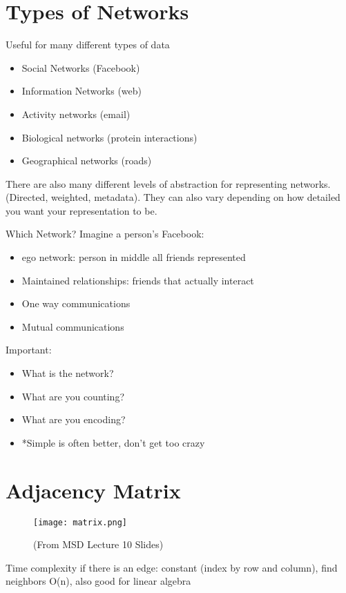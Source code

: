 \section{ Types of Networks}
Useful for many different types of data
\begin{itemize}
    \item Social Networks (Facebook)
    \item Information Networks (web) 
    \item Activity networks (email)
    \item Biological networks (protein interactions)
    \item Geographical networks (roads) 
\end{itemize}
There are also many different levels of abstraction for representing networks.(Directed, weighted, metadata). They can also vary depending on how detailed you want your representation to be. 

Which Network? Imagine a person's Facebook: 
\begin{itemize}
    \item ego network: person in middle all friends represented
    \item Maintained relationships: friends that actually interact
    \item One way communications
    \item Mutual communications 
\end{itemize}
Important: 
\begin{itemize}
    \item What is the network?
    \item What are you counting?
    \item What are you encoding?
    \item *Simple is often better, don't get too crazy 
\end{itemize}
\clearpage
\section{Adjacency Matrix}
\begin{figure}[ht]
  \begin{center}
    \texttt{[image: matrix.png]}
    \caption{(From MSD Lecture 10 Slides) 
     }
    \label{fig:example_figure}
  \end{center}
\end{figure}

 Time complexity if there is an edge: constant (index by row and column), find neighbors O(n), also good for linear algebra
 
